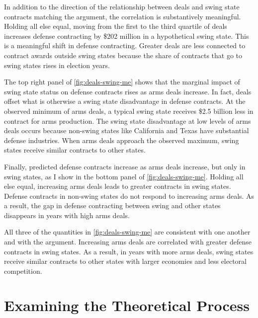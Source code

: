\documentclass[12pt]{article}
\begin{document}
In addition to the direction of the relationship between deals and swing state contracts matching the argument, the correlation is substantively meaningful. 
Holding all else equal, moving from the first to the third quartile of deals increases defense contracting by \$202 million in a hypothetical swing state. 
This is a meaningful shift in defense contracting. 
Greater deals are less connected to contract awards outside swing states because the share of contracts that go to swing states rises in election years. 


The top right panel of \autoref{fig:deals-swing-me} shows that the marginal impact of swing state status on defense contracts rises as arms deals increase.  
In fact, deals offset what is otherwise a swing state disadvantage in defense contracts. 
At the observed minimum of arms deals, a typical swing state receives \$2.5 billion less in contract for arms production.
The swing state disadvantage at low levels of arms deals occurs because non-swing states like California and Texas have substantial defense industries.
When arms deals approach the observed maximum, swing states receive similar contracts to other states. 


Finally, predicted defense contracts increase as arms deals increase, but only in swing states, as I show in the bottom panel of \autoref{fig:deals-swing-me}. 
Holding all else equal, increasing arms deals leads to greater contracts in swing states. 
Defense contracts in non-swing states do not respond to increasing arms deals.
As a result, the gap in defense contracting between swing and other states disappears in years with high arms deals. 


All three of the quantities in  \autoref{fig:deals-swing-me} are consistent with one another and with the argument. 
Increasing arms deals are correlated with greater defense contracts in swing states. 
As a result, in years with more arms deals, swing states receive similar contracts to other states with larger economies and less electoral competition.


\section{Examining the Theoretical Process}
\end{document}
